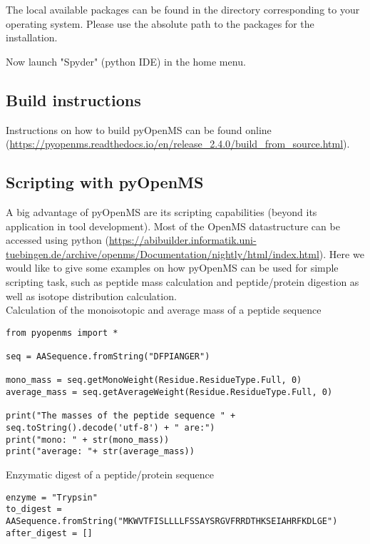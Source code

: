 {\noindent The local available packages can be found in the directory corresponding to your operating system. Please use the absolute path to the packages for the installation.
    
\noindent  Now launch "Spyder" (python IDE) in the home menu.

\subsection{Build instructions}
Instructions on how to build pyOpenMS can be found online (\url{https://pyopenms.readthedocs.io/en/release_2.4.0/build_from_source.html}).

\subsection{Scripting with pyOpenMS}
A big advantage of pyOpenMS are its scripting capabilities (beyond its application in tool development). Most of the OpenMS datastructure can be accessed using python (\url{https://abibuilder.informatik.uni-tuebingen.de/archive/openms/Documentation/nightly/html/index.html}). Here we would like to give some examples on how pyOpenMS can be used for simple scripting task, such as peptide mass calculation and peptide/protein digestion as well as isotope distribution calculation. \\

\noindent Calculation of the monoisotopic and average mass of a peptide sequence 
\begin{listing}
\begin{verbatim}
from pyopenms import *

seq = AASequence.fromString("DFPIANGER")

mono_mass = seq.getMonoWeight(Residue.ResidueType.Full, 0)
average_mass = seq.getAverageWeight(Residue.ResidueType.Full, 0)

print("The masses of the peptide sequence " + seq.toString().decode('utf-8') + " are:")
print("mono: " + str(mono_mass))
print("average: "+ str(average_mass))
\end{verbatim}
\end{listing}

\noindent Enzymatic digest of a peptide/protein sequence 
\begin{listing}
\begin{verbatim}
enzyme = "Trypsin"
to_digest = AASequence.fromString("MKWVTFISLLLLFSSAYSRGVFRRDTHKSEIAHRFKDLGE")
after_digest = []


\end{verbatim}
\end{listing}}
